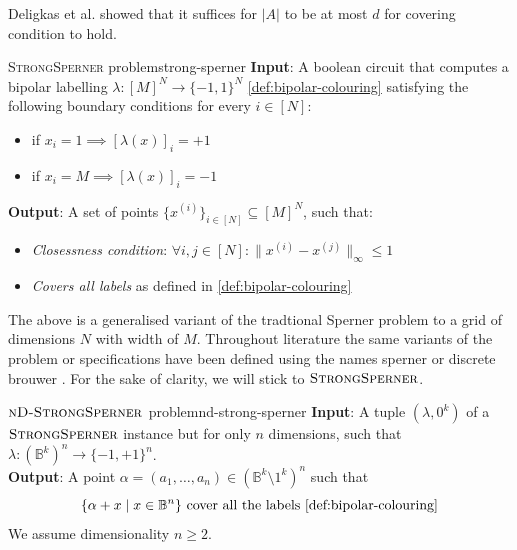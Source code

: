 Deligkas et al. \cite{deligkas_PureCircuitTightInapproximability_2024} showed that
it suffices for $|A|$ to be at most $d$ for covering condition to hold.

\begin{definitionbox}{\textsc{StrongSperner} problem}{strong-sperner}
    \textbf{Input}: A boolean circuit that computes a bipolar labelling $\lambda: [M]^N \to \{-1, 1\}^N$ \ref{def:bipolar-colouring}
    satisfying the following boundary conditions for every $i \in [N]$:
    \begin{itemize}
        \item if $x_i = 1 \implies [\lambda(x)]_i = +1$
        \item if $x_i = M \implies [\lambda(x)]_i = -1$
    \end{itemize}
    \textbf{Output}: A set of points $\{x^{(i)}\}_{i \in [N]} \subseteq [M]^{N}$, such that:
    \begin{itemize}
        \item \textit{Closessness condition}: $\forall i,j \in [N]: \|x^{(i)} - x^{(j)}\|_{\infty} \leq 1$
        \item \textit{Covers all labels} as defined in \ref{def:bipolar-colouring}
    \end{itemize}
\end{definitionbox}

The above is a generalised variant of the tradtional Sperner problem to
a grid of dimensions $N$ with width of $M$. 
Throughout literature the same variants of the problem or specifications
have been defined using the names sperner or discrete brouwer \cite{chen_SettlingComplexityComputing_2009, chen_Complexity2DDiscrete_2009, daskalakis_ComplexityComputingNash_2006, deligkas_PureCircuitTightInapproximability_2024}.
For the sake of clarity, we will stick to $\textsc{StrongSperner}$.

\begin{definitionbox}{$\textnormal{\textsc{nD-StrongSperner}}$ problem}{nd-strong-sperner}
    \textbf{Input}: A tuple $(\lambda,0^k)$ of a $\textnormal{\textsc{StrongSperner}}$ instance but for only $n$ dimensions, such that
    $\lambda : (\mathbb{B}^k)^n \to \{-1, +1\}^n$.\\
    \textbf{Output}: A point $\alpha = (a_1, \hdots, a_n) \in (\mathbb{B}^k \setminus{1^k})^n$ such that
    $$
    \{\alpha + x \mid x \in \mathbb{B}^n\} \text{ cover all the labels \ref{def:bipolar-colouring}}
    $$
    We assume dimensionality $n \geq 2$.
\end{definitionbox}

